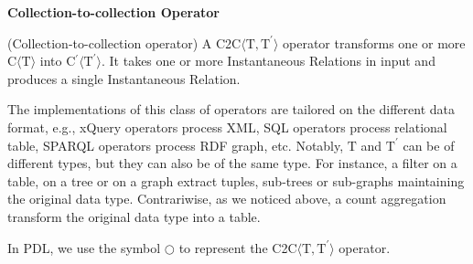 \medskip
\noindent
\textbf{Collection-to-collection Operator}
\medskip

\begin{Definition}
(Collection-to-collection operator) A C2C$\langle\mathrm{T},\mathrm{T^{\prime}}\rangle$ operator transforms one or more C$\langle\mathrm{T}\rangle$ into C$^{\prime}\langle\mathrm{T^{\prime}}\rangle$. 
It takes one or more Instantaneous Relations in input and produces a single Instantaneous Relation.
\end{Definition}

The implementations of this class of operators are tailored on the different data format, e.g., xQuery operators process  XML,  SQL operators process relational table, SPARQL operators process RDF graph, etc. Notably, $\mathrm{T}$ and $\mathrm{T^{\prime}}$ can be of different types, but they can also be of the same type. For instance, a filter on a table, on a tree or on a graph extract tuples, sub-trees or sub-graphs maintaining the original data type. Contrariwise, as we noticed above, a count aggregation transform the original data type into a table.

\noindent
In PDL, we use the symbol $\bigcirc$ to represent the C2C$\langle\mathrm{T},\mathrm{T^{\prime}}\rangle$ operator.

